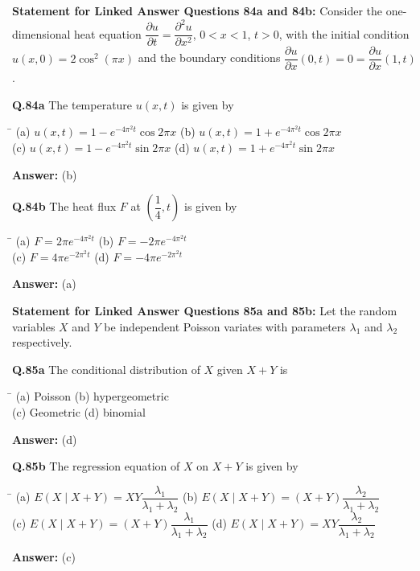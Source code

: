 \documentclass[11pt,a4paper]{article}
\newcommand{\optsfour}[4]{%
  \begin{tabbing}
    \hspace{0.48\linewidth}\=\kill
    (a) #1 \> (b) #2 \\[2pt]
    (c) #3 \> (d) #4
  \end{tabbing}%
}
\newcommand{\ans}[1]{\textbf{Answer:} #1\par\medskip}
\begin{document}
\medskip
\textbf{Statement for Linked Answer Questions 84a and 84b:}
Consider the one-dimensional heat equation $\dfrac{\partial u}{\partial t} = \dfrac{\partial^2 u}{\partial x^2}$, $0 < x < 1$, $t > 0$, with the initial condition $u(x,0) = 2\cos^2(\pi x)$ and the boundary conditions $\dfrac{\partial u}{\partial x}(0, t) = 0 = \dfrac{\partial u}{\partial x}(1, t)$.

\textbf{Q.84a} The temperature $u(x, t)$ is given by
\optsfour{$u(x, t) = 1 - e^{-4\pi^2 t}\cos 2\pi x$}{$u(x, t) = 1 + e^{-4\pi^2 t}\cos 2\pi x$}{$u(x, t) = 1 - e^{-4\pi^2 t}\sin 2\pi x$}{$u(x, t) = 1 + e^{-4\pi^2 t}\sin 2\pi x$}
\ans{(b)}

\textbf{Q.84b} The heat flux $F$ at $\left(\dfrac{1}{4}, t\right)$ is given by
\optsfour{$F = 2\pi e^{-4\pi^2 t}$}{$F = -2\pi e^{-4\pi^2 t}$}{$F = 4\pi e^{-2\pi^2 t}$}{$F = -4\pi e^{-2\pi^2 t}$}
\ans{(a)}

\medskip
\textbf{Statement for Linked Answer Questions 85a and 85b:}
Let the random variables $X$ and $Y$ be independent Poisson variates with parameters $\lambda_1$ and $\lambda_2$ respectively.

\textbf{Q.85a} The conditional distribution of $X$ given $X + Y$ is
\optsfour{Poisson}{hypergeometric}{Geometric}{binomial}
\ans{(d)}

\textbf{Q.85b} The regression equation of $X$ on $X + Y$ is given by
\optsfour{$E(X \mid X + Y) = XY\dfrac{\lambda_1}{\lambda_1 + \lambda_2}$}{$E(X \mid X + Y) = (X + Y)\dfrac{\lambda_2}{\lambda_1 + \lambda_2}$}{$E(X \mid X + Y) = (X + Y)\dfrac{\lambda_1}{\lambda_1 + \lambda_2}$}{$E(X \mid X + Y) = XY\dfrac{\lambda_2}{\lambda_1 + \lambda_2}$}
\ans{(c)}
\end{document}
